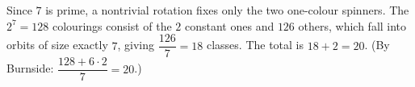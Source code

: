 Since $7$ is prime, a nontrivial rotation fixes only the two one-colour spinners. The $2^7=128$ colourings consist of the $2$ constant ones and $126$ others, which fall into orbits of size exactly $7$, giving $\dfrac{126}{7}=18$ classes. The total is $18+2=\boxed{20}$. (By Burnside: $\dfrac{128+6\cdot2}{7}=20$.)
